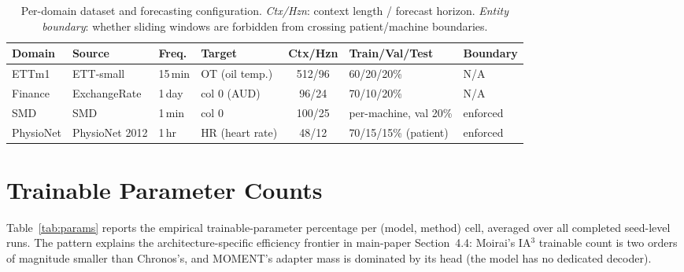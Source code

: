 \begin{table}[ht]
\centering
\caption{Per-domain dataset and forecasting configuration. \emph{Ctx/Hzn}: context length / forecast horizon. \emph{Entity boundary}: whether sliding windows are forbidden from crossing patient/machine boundaries.}
\label{tab:domain-stats}
\footnotesize
\setlength{\tabcolsep}{4pt}
\begin{tabular}{l l l l c l l}
\toprule
Domain & Source & Freq. & Target & Ctx/Hzn & Train/Val/Test & Boundary \\
\midrule
ETTm1     & ETT-small      & 15\,min & OT (oil temp.)  & 512/96 & 60/20/20\%             & N/A \\
Finance   & ExchangeRate   & 1\,day  & col 0 (AUD)     & 96/24  & 70/10/20\%             & N/A \\
SMD       & SMD            & 1\,min  & col 0           & 100/25 & per-machine, val 20\%  & enforced \\
PhysioNet & PhysioNet 2012 & 1\,hr   & HR (heart rate) & 48/12  & 70/15/15\% (patient)   & enforced \\
\bottomrule
\end{tabular}
\end{table}

\section{Trainable Parameter Counts}
\label{sec:params}
Table~\ref{tab:params} reports the empirical trainable-parameter percentage per (model, method) cell, averaged over all completed seed-level runs. The pattern explains the architecture-specific efficiency frontier in main-paper Section~4.4: Moirai's IA$^3$ trainable count is two orders of magnitude smaller than Chronos's, and MOMENT's adapter mass is dominated by its head (the model has no dedicated decoder).

